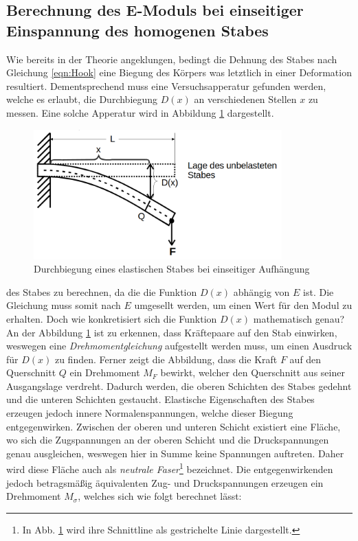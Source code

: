 \subsection{Berechnung des E-Moduls bei einseitiger Einspannung des homogenen Stabes}

Wie bereits in der Theorie angeklungen, bedingt die Dehnung des Stabes nach Gleichung \eqref{eqn:Hook} eine Biegung des Körpers
was letztlich in einer Deformation resultiert. Dementsprechend muss eine Versuchsapperatur gefunden werden, welche es erlaubt,
die Durchbiegung $D(x)$ an verschiedenen Stellen $x$ zu messen. Eine solche Apperatur wird in Abbildung \ref{fig:Durchbiegung}
dargestellt.

\begin{figure}
    \centering
    \includegraphics[height=5cm]{Durchbiegung.png}
    \caption{Durchbiegung eines elastischen Stabes bei einseitiger Aufhängung}
    \label{fig:Durchbiegung}
\end{figure}

des Stabes zu berechnen, da die die Funktion $D(x)$ abhängig von $E$ ist. Die Gleichung muss somit nach $E$ umgesellt werden, um 
einen Wert für den Modul zu erhalten. Doch wie konkretisiert sich die Funktion $D(x)$ mathematisch genau?\\
An der Abbildung \ref{fig:Durchbiegung} ist zu erkennen, dass Kräftepaare auf den Stab einwirken, weswegen eine
\emph{Drehmomentgleichung} aufgestellt werden muss, um einen Ausdruck für $D(x)$ zu finden. Ferner zeigt die Abbildung, dass die Kraft $F$
auf den Querschnitt $Q$ ein Drehmoment $M_F$ bewirkt, welcher den Querschnitt aus seiner Ausgangslage verdreht. Dadurch werden,
die oberen Schichten des Stabes gedehnt und die unteren Schichten gestaucht. Elastische Eigenschaften des Stabes erzeugen jedoch
innere Normalenspannungen, welche dieser Biegung entgegenwirken. Zwischen der oberen und unteren Schicht existiert eine Fläche,
wo sich die Zugspannungen an der oberen Schicht und die Druckspannungen genau ausgleichen, weswegen hier in Summe keine Spannungen 
auftreten. Daher wird diese Fläche auch als \emph{neutrale Faser}\footnote{In Abb. \ref{fig:Durchbiegung} wird ihre Schnittline als gestrichelte Linie dargestellt.} bezeichnet.
Die entgegenwirkenden jedoch betragsmäßig äquivalenten Zug- und Druckspannungen erzeugen ein Drehmoment $M_\sigma$, welches sich wie folgt
berechnet lässt:

